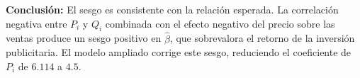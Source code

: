 \documentclass[10pt,a4paper]{article}
\begin{document}
\begin{enumerate}
\begin{enumerate}[label=(\alph*)]
{\begin{enumerate}[label=(\alph*)]
\textbf{Conclusión:} El sesgo es consistente con la relación esperada. La correlación
negativa entre $P_i$ y $Q_i$ combinada con el efecto negativo del precio sobre las ventas
produce un sesgo positivo en $\hat{\beta}$, que sobrevalora el retorno de la inversión
publicitaria. El modelo ampliado corrige este sesgo, reduciendo el coeficiente de $P_i$
de $6.114$ a $4.5$.
\end{enumerate}

}



\end{enumerate}




\end{enumerate}
\end{document}
